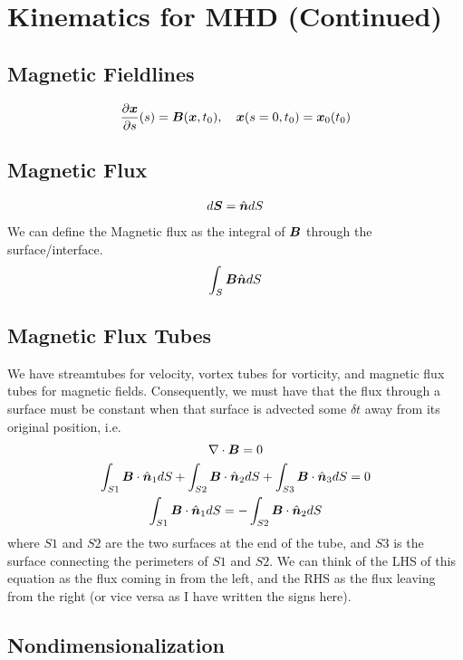 \documentclass{article}
\begin{document}
\section{Kinematics for MHD (Continued)}

\subsection{Magnetic Fieldlines}

\begin{gather*}
    \frac{\partial \boldsymbol{x}}{\partial s}(s) = \boldsymbol{B}(\boldsymbol{x},t_0), \quad \boldsymbol{x}(s=0,t_0) = \boldsymbol{x}_0(t_0)
\end{gather*}

\subsection{Magnetic Flux}

\begin{gather*}
    d\boldsymbol{S} = \hat{\boldsymbol{n}}dS
\end{gather*}
We can define the Magnetic flux as the integral of $\boldsymbol{B}$ through the
surface/interface. 
\begin{gather*}
    \int_S\boldsymbol{B}\hat{\boldsymbol{n}}dS
\end{gather*}

\subsection{Magnetic Flux Tubes}

We have streamtubes for velocity, vortex tubes for vorticity, and magnetic flux tubes
for magnetic fields. Consequently, we must have that the flux through a surface
must be constant when that surface is advected some $\delta t$ away from its
original position, i.e.
\begin{gather*}
    \nabla \cdot{\boldsymbol{B}} = 0\\
    \int_{S1} \boldsymbol{B}\cdot\hat{\boldsymbol{n}}_1dS + \int_{S2} \boldsymbol{B}\cdot\hat{\boldsymbol{n}}_2dS +
    \int_{S3} \boldsymbol{B}\cdot\hat{\boldsymbol{n}}_3dS = 0\\
     \int_{S1} \boldsymbol{B}\cdot\hat{\boldsymbol{n}}_1dS = - \int_{S2} \boldsymbol{B}\cdot\hat{\boldsymbol{n}}_2dS
\end{gather*}
where $S1$ and $S2$ are the two surfaces at the end of the tube, and $S3$ is the
surface connecting the perimeters of $S1$ and $S2$. We can think of the LHS of
this equation as the flux coming in from the left, and the RHS as the flux
leaving from the right (or vice versa as I have written the signs here). 

\subsection{Nondimensionalization}
\end{document}
